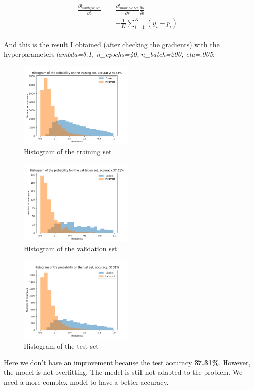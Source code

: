 \documentclass{article}
\begin{document}
\begin{equation}
    \begin{split}
        \frac{\partial l_{multiple\ bce}}{\partial b} &= \frac{\partial l_{multiple\ bce}}{\partial s} \frac{\partial s}{\partial b} \\
        &= -\frac{1}{K}\sum_{i=1}^{K} (y_i - p_i) \\
    \end{split}
\end{equation}

And this is the result I obtained (after checking the gradients) with the hyperparameters \textit{lambda=0.1, n\_epochs=40, n\_batch=200, eta=.005}:
\begin{figure}[H]
    \centering
    \includegraphics[width=0.5\textwidth]{Result_Pics/histogram_train.png}
    \caption{Histogram of the training set}
\end{figure}
\begin{figure}[H]
    \centering
    \includegraphics[width=0.5\textwidth]{Result_Pics/histogram_val.png}
    \caption{Histogram of the validation set}
\end{figure}
\begin{figure}[H]
    \centering
    \includegraphics[width=0.5\textwidth]{Result_Pics/histogram_test.png}
    \caption{Histogram of the test set}
\end{figure}

Here we don't have an improvement because the test accuracy \textbf{37.31\%}. However, the model is not overfitting. The model is still not adapted to the problem. We need a more complex model to have a better accuracy.
\end{document}
